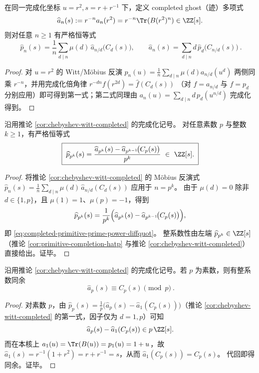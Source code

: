 \begin{corollary}\label{cor:chebyshev-witt-completed}
在同一完成化坐标 \(u=r^2,s=r+r^{-1}\) 下，定义 completed ghost（迹）多项式
\[
\widehat a_n(s):=r^{-n}a_n(r^2)=r^{-n}\Tr(B(r^2)^n)\in\ZZ[s].
\]
则对任意 \(n\ge 1\) 有严格恒等式
\[
\boxed{\ 
\widehat p_n(s)=\frac1n\sum_{d\mid n}\mu(d)\,\widehat a_{n/d}\!\bigl(C_d(s)\bigr),
\qquad
\widehat a_n(s)=\sum_{d\mid n}d\,\widehat p_d\!\bigl(C_{n/d}(s)\bigr)
\ }.
\]
\end{corollary}
\begin{proof}
对 \(u=r^2\) 的 Witt/Möbius 反演
\(
p_n(u)=\frac1n\sum_{d\mid n}\mu(d)a_{n/d}(u^d)
\)
两侧同乘 \(r^{-n}\)，并用完成化倍角律
\(
r^{-dn}f(r^{2d})=\widehat f(C_d(s))
\)
（对 \(f=a_{n/d}\) 与 \(f=p_d\) 分别应用）即可得到第一式；第二式同理由
\(
a_n(u)=\sum_{d\mid n} d\,p_d(u^{n/d})
\)
完成化得到。
\end{proof}

\begin{theorem}[完成化 primitive 的素幂差商解码恒等式]\label{thm:completed-primitive-prime-power-difference-quotient}
沿用推论 \ref{cor:chebyshev-witt-completed} 的完成化记号。
对任意素数 \(p\) 与整数 \(k\ge 1\)，有严格恒等式
\begin{equation}\label{eq:completed-primitive-prime-power-diffquot}
\boxed{\;
\widehat p_{p^k}(s)
=\frac{\widehat a_{p^k}(s)-\widehat a_{p^{k-1}}\!\bigl(C_p(s)\bigr)}{p^k}
\ \in\ \ZZ[s].\;}
\end{equation}
\end{theorem}
\begin{proof}
将推论 \ref{cor:chebyshev-witt-completed} 的 Möbius 反演式
\(
\widehat p_n(s)=\frac1n\sum_{d\mid n}\mu(d)\,\widehat a_{n/d}(C_d(s))
\)
应用于 \(n=p^k\)。
由于 \(\mu(d)=0\) 除非 \(d\in\{1,p\}\)，且 \(\mu(1)=1\)、\(\mu(p)=-1\)，得到
\[
\widehat p_{p^k}(s)
=\frac{1}{p^k}\Bigl(\widehat a_{p^k}(s)-\widehat a_{p^{k-1}}\!\bigl(C_p(s)\bigr)\Bigr),
\]
即 \eqref{eq:completed-primitive-prime-power-diffquot}。
整系数性由左端 \(\widehat p_{p^k}\in\ZZ[s]\)（推论 \ref{cor:primitive-completion-hatp} 与推论 \ref{cor:chebyshev-witt-completed}）直接给出。证毕。
\end{proof}

\begin{corollary}\label{cor:completed-prime-congruence}
沿用推论 \ref{cor:chebyshev-witt-completed} 的完成化记号。若 \(p\) 为素数，则有整系数同余
\[
\boxed{\ \widehat a_p(s)\equiv C_p(s)\pmod p\ }.
\]
\end{corollary}
\begin{proof}
对素数 \(p\)，由 \(\widehat p_p(s)=\frac1p\bigl(\widehat a_p(s)-\widehat a_1(C_p(s))\bigr)\)（推论 \ref{cor:chebyshev-witt-completed} 的第一式，因子仅为 \(d=1,p\)）可知
\[
\widehat a_p(s)-\widehat a_1(C_p(s))\in p\,\ZZ[s].
\]
而在本核上 \(a_1(u)=\Tr(B(u))=p_1(u)=1+u\)，故
\(
\widehat a_1(s)=r^{-1}(1+r^2)=r+r^{-1}=s
\)，从而 \(\widehat a_1(C_p(s))=C_p(s)\)。
代回即得同余。证毕。
\end{proof}

